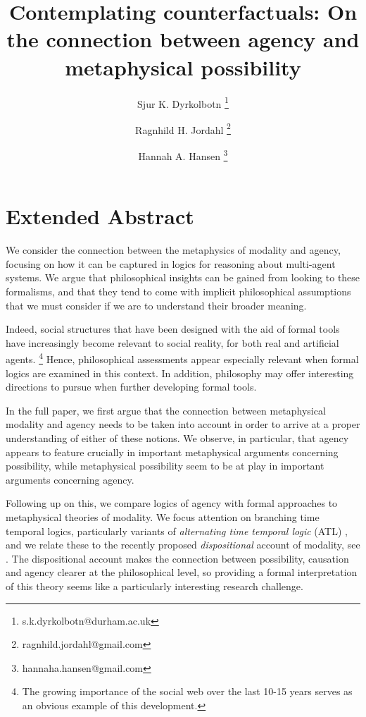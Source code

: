 \documentclass{article}
\begin{document}
\title{Contemplating counterfactuals: On the connection between agency and metaphysical possibility}
\author[1]{Sjur K. Dyrkolbotn \thanks{s.k.dyrkolbotn@durham.ac.uk}}
\author[2]{Ragnhild H. Jordahl \thanks{ragnhild.jordahl@gmail.com}}
\author[3]{Hannah A. Hansen \thanks{hannaha.hansen@gmail.com}}

\date{}
\maketitle

\section*{Extended Abstract}

We consider the connection between the metaphysics of modality and agency, focusing on how it can be captured in logics for reasoning about multi-agent systems. We argue that philosophical insights can be gained from looking to these formalisms, and that they tend to come with implicit philosophical assumptions that we must consider if we are to understand their broader meaning.

Indeed, social structures that have been designed with the aid of formal tools have increasingly become relevant to social reality, for both real and artificial agents. \footnote{The growing importance of the social web over the last 10-15 years serves as an obvious example of this development.} Hence, philosophical assessments appear especially relevant when formal logics are examined in this context. In addition, philosophy may offer interesting directions to pursue when further developing formal tools.

In the full paper, we first argue that the connection between metaphysical modality and agency needs to be taken into account in order to arrive at a proper understanding of either of these notions. We observe, in particular, that agency appears to feature crucially in important metaphysical arguments concerning possibility, while metaphysical possibility seem to be at play in important arguments concerning agency.

Following up on this, we compare logics of agency with formal approaches to metaphysical theories of modality. We focus attention on branching time temporal logics, particularly variants of \emph{alternating time temporal logic} (ATL) \cite{atl}, and we relate these to the recently proposed \emph{dispositional} account of modality, see \cite{dispmod,MwPw}. The dispositional account makes the connection between possibility, causation and agency clearer at the philosophical level, so providing a formal interpretation of this theory seems like a particularly interesting research challenge.
\end{document}
